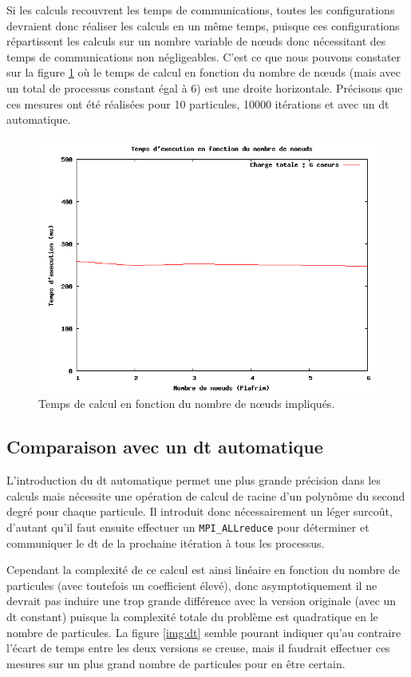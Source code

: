 Si les calculs recouvrent les temps de communications, toutes les configurations devraient donc réaliser les calculs en un même temps, puisque ces configurations répartissent les calculs sur un nombre variable de n\oe uds donc nécessitant des temps de communications non négligeables. C'est ce que nous pouvons constater sur la figure \ref{img:nodes} où le temps de calcul en fonction du nombre de n\oe uds (mais avec un total de processus constant égal à 6) est une droite horizontale. Précisons que ces mesures ont été réalisées pour 10 particules, 10000 itérations et avec un dt automatique.

\begin{figure}
\centering
\includegraphics[scale=0.5]{img/graph_nodes.png}
\caption{Temps de calcul en fonction du nombre de n\oe uds impliqués.}
\label{img:nodes}
\end{figure}

\subsection{Comparaison avec un dt automatique}

L'introduction du dt automatique permet une plus grande précision dans les calculs mais nécessite une opération de calcul de racine d'un polynôme du second degré pour chaque particule. Il introduit donc nécessairement un léger surcoût, d'autant qu'il faut ensuite effectuer un \texttt{MPI\_ALLreduce} pour déterminer et communiquer le dt de la prochaine itération à tous les processus.

Cependant la complexité de ce calcul est ainsi linéaire en fonction du nombre de particules (avec toutefois un coefficient élevé), donc asymptotiquement il ne devrait pas induire une trop grande différence avec la version originale (avec un dt constant) puisque la complexité totale du problème est quadratique en le nombre de particules. La figure \ref{img:dt} semble pourant indiquer qu'au contraire l'écart de temps entre les deux versions se creuse, mais il faudrait effectuer ces mesures sur un plus grand nombre de particules pour en être certain.

